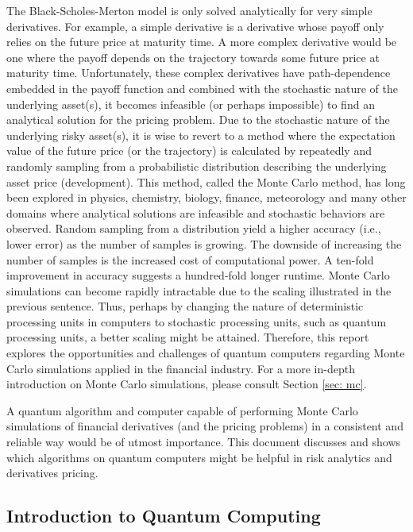 \documentclass[../main.tex]{subfiles}
\begin{document}
The Black-Scholes-Merton model is only solved analytically for very simple derivatives. For example, a simple derivative is a derivative whose payoff only relies on the future price at maturity time. A more complex derivative would be one where the payoff depends on the trajectory towards some future price at maturity time. Unfortunately, these complex derivatives have path-dependence embedded in the payoff function and combined with the stochastic nature of the underlying asset(s), it becomes infeasible (or perhaps impossible) to find an analytical solution for the pricing problem. Due to the stochastic nature of the underlying risky asset(s), it is wise to revert to a method where the expectation value of the future price (or the trajectory) is calculated by repeatedly and randomly sampling from a probabilistic distribution describing the underlying asset price (development). This method, called the Monte Carlo method, has long been explored in physics, chemistry, biology, finance, meteorology and many other domains where analytical solutions are infeasible and stochastic behaviors are observed. Random sampling from a distribution yield a higher accuracy (i.e., lower error) as the number of samples is growing. The downside of increasing the number of samples is the increased cost of computational power. A ten-fold improvement in accuracy suggests a hundred-fold longer runtime. Monte Carlo simulations can become rapidly intractable due to the scaling illustrated in the previous sentence. Thus, perhaps by changing the nature of deterministic processing units in computers to stochastic processing units, such as quantum processing units, a better scaling might be attained. Therefore, this report explores the opportunities and challenges of quantum computers regarding Monte Carlo simulations applied in the financial industry. For a more in-depth introduction on Monte Carlo simulations, please consult Section \ref{sec: mc}.
\par

A quantum algorithm and computer capable of performing Monte Carlo simulations of financial derivatives (and the pricing problems) in a consistent and reliable way would be of utmost importance. This document discusses and shows which algorithms on quantum computers might be helpful in risk analytics and derivatives pricing.\par

\subsection{Introduction to Quantum Computing} \label{sec: intro_qm}
\end{document}
